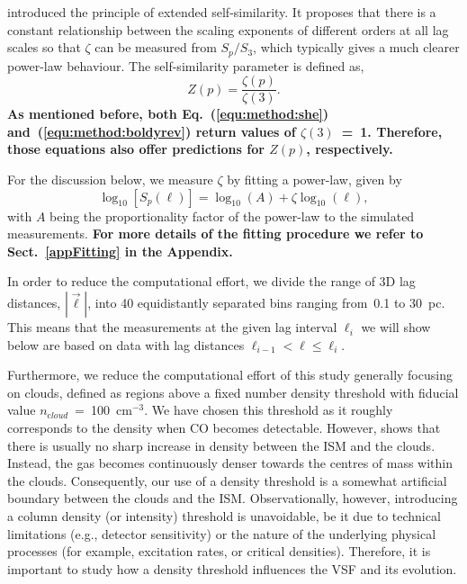\citet{Benzi1993} introduced the principle of extended self-similarity.
It proposes that there is a constant relationship between the scaling
exponents of different orders at all lag scales so that $\zeta$ can be measured from $S_p/S_3$, which typically gives a much clearer power-law behaviour.
The self-similarity parameter is defined as,
\begin{equation}
	Z(p) = \frac{\zeta(p)}{\zeta(3)}.
	\label{equ:method:z_def}
\end{equation} 
\textbf{\noindent
    As mentioned before, both Eq.~(\ref{equ:method:she}) and~(\ref{equ:method:boldyrev}) return values of $\zeta(3)$~=~1.
    Therefore, those equations also offer predictions for $Z(p)$, respectively.
}

For the discussion below, we measure $\zeta$ by fitting a power-law,
given by
\begin{equation}
	\log_{10}\left[ S_p(\ell) \right] = \log_{10}\left(A\right) + \zeta \log_{10}(\ell) ,
	\label{equ:method:fitting}
\end{equation}
with $A$ being the proportionality factor of the power-law to the simulated measurements.
\textbf{
	For more details of the fitting procedure we refer to Sect.~\ref{appFitting} in the Appendix.
}

In order to reduce the computational effort, we divide the range of 3D lag distances, $|\vec{\ell}|$, into 40 equidistantly separated bins ranging from~0.1 to 30~pc.
This means that the measurements at the given lag interval $\ell_i$ we will show below are based on data with lag distances $\ell_{i-1} < \ell \leq \ell_i$.

Furthermore, we reduce the computational effort of this study generally focusing on clouds, defined as regions above a fixed number density threshold with fiducial value $n_{\mathrm cloud}$~=~100~cm$^{-3}$.  We have chosen this threshold as it roughly corresponds to the density when CO becomes detectable.
However,  shows that there is usually no sharp increase in density between the ISM and the clouds. 
Instead, the gas becomes continuously denser towards the centres of mass within the clouds. 
Consequently, our use of a density threshold is a somewhat artificial boundary between the clouds and the ISM. Observationally, however, introducing a column density (or intensity) threshold is unavoidable, be it due to technical limitations (e.g., detector sensitivity) or the nature of the underlying physical processes (for example, excitation rates, or critical densities).
Therefore, it is important to study how a density threshold influences the VSF and its evolution.


